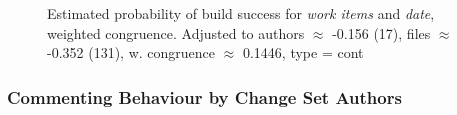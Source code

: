 \documentclass[12pt,oneside]{book}
\begin{document}
\begin{figure}[b]
{     \label{subfig:prob_weighted_workitems_age_q100}
  }
  \caption{Estimated probability of build success for \emph{work items} and \emph{date}, weighted congruence. Adjusted to authors $\approx$ -0.156 (17), files $\approx$ -0.352 (131), w. congruence $\approx$ 0.1446, type = cont}
  \label{fig:weighted_congruence_workitems_age}
\end{figure}



\subsubsection{Commenting Behaviour by Change Set Authors}
\label{sec:commenting}
\end{document}
